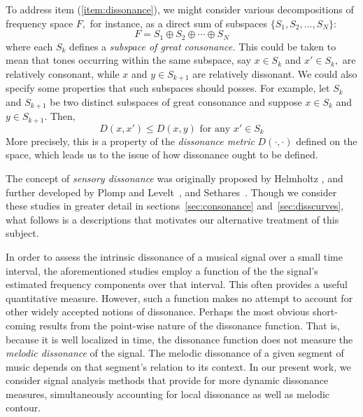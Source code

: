 To address item (\ref{item:dissonance}), we might consider various
decompositions of frequency space $F,$ for instance, as a direct sum
of subspaces $\{S_1, S_2, \ldots, S_N\}$: 
\[ F = S_1 \oplus S_2 \oplus \cdots \oplus S_N\]
where each $S_k$ defines a \emph{subspace of great consonance.}
This could be taken to mean that tones occurring within 
the same subspace, say $x \in S_k$ and  $x' \in S_k,$ are relatively
consonant, while $x$ and  
$y \in S_{k+1}$ are relatively dissonant.  We could also specify some
properties that such subspaces should posses. For example, let $S_k$
and $S_{k+1}$ be two distinct subspaces of great consonance and
suppose $x \in S_k$ and $y \in S_{k+1}$.  Then, 
\[
D(x,x') \leq D(x,y) \mbox{ for any } x' \in S_k
\] 
More precisely, this is a property of the \emph{dissonance metric}
$D(\cdot,\cdot)$ defined on the space, which leads us to the issue of how
dissonance ought to be defined.


The concept of \emph{sensory dissonance} was originally proposed
by Helmholtz \cite{Helmholtz:1877}, and further developed by Plomp and 
Levelt~\cite{Plomp:1965}, and Sethares~\cite{Sethares:1997}.
Though we consider these studies in greater detail in
sections~\ref{sec:consonance} and~\ref{sec:disscurves}, what follows
is a descriptions that motivates our alternative treatment of this
subject. 

In order to assess the intrinsic dissonance of a musical signal over a
small time interval, the aforementioned studies employ a function of
the the signal's estimated frequency components over that interval.
This often provides a useful quantitative measure.  However, such a
function makes no attempt to account for other widely accepted notions
of dissonance.   
Perhaps the most obvious short-coming results from the point-wise
nature of the dissonance function.  That is, because it is
well localized in time, the dissonance function does not 
measure the \emph{melodic dissonance} of the signal.  The melodic
dissonance of a given segment of music depends on that 
segment's relation to its context.  In our present work, we
consider signal analysis methods that provide for
more dynamic dissonance measures, simultaneously accounting for local
dissonance as well as melodic contour.

